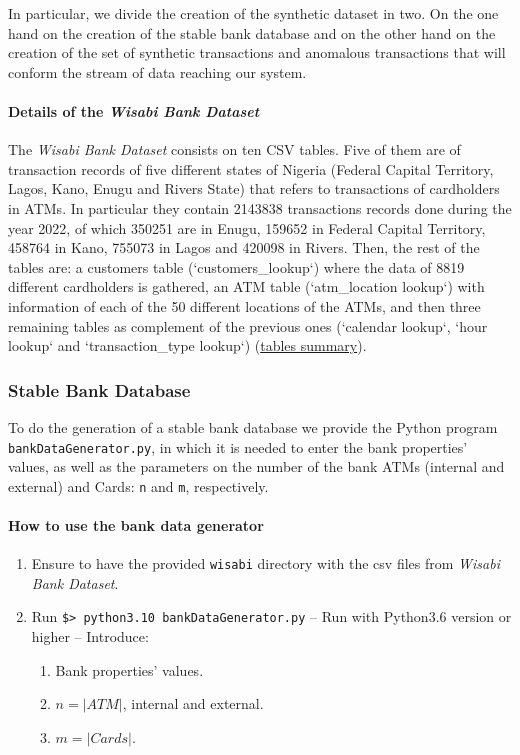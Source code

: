 In particular, we divide the creation of the synthetic dataset in two. On the one hand on the creation of the stable bank database and on the other hand on the creation of the set of synthetic transactions and anomalous transactions that will conform the stream of data reaching our system.

\paragraph{Details of the \emph{Wisabi Bank Dataset\\}}
The \emph{Wisabi Bank Dataset} consists on ten CSV tables. Five of them are of transaction records of five different states of Nigeria (Federal Capital Territory, Lagos, Kano, Enugu and Rivers State) that refers to transactions of cardholders in ATMs. In particular they contain 2143838 transactions records done during the year 2022, of which 350251 are in Enugu, 159652 in Federal Capital Territory, 458764 in Kano, 755073 in Lagos and 420098 in Rivers. Then, the rest of the tables are: a customers table (`customers\_lookup`) where the data
of 8819 different cardholders is gathered, an ATM table (`atm\_location lookup`) with
information of each of the 50 different locations of the ATMs, and then three remaining
tables as complement of the previous ones (`calendar lookup`, `hour lookup` and 
`transaction\_type lookup`) 
(\href{https://app.diagrams.net/#G1eAn47YR7-zPNE5KgStkA6_IJcxZRYgX8#%7B%22pageId%22%3A%22R2lEEEUBdFMjLlhIrx00%22%7D}{tables summary}).

\subsubsection{Stable Bank Database}

To do the generation of a stable bank database we provide the Python program \texttt{bankDataGenerator.py}, in which it is needed to enter the bank properties' values, 
as well as the parameters on the number of the bank ATMs (internal and external) and Cards: \texttt{n} and \texttt{m}, respectively. 

\paragraph{How to use the bank data generator}

\begin{enumerate}
    \item Ensure to have the provided \texttt{wisabi} directory with the csv files from \emph{Wisabi Bank Dataset}.
    \item Run \texttt{\$> python3.10 bankDataGenerator.py} -- Run with Python3.6 version or higher -- Introduce:
    \begin{enumerate}
        \item Bank properties' values.
        \item $n = |ATM|$, internal and external.
        \item $m = |Cards|$.
    \end{enumerate}
\end{enumerate}


